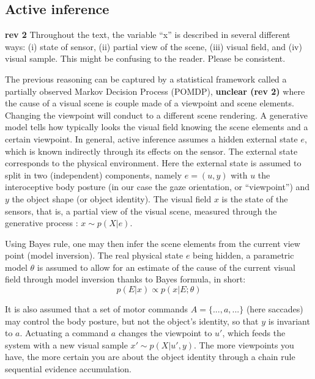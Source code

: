 \subsection*{Active inference}

{\color{red} {\bf rev 2} Throughout the text, the variable “x” is described in several different ways: (i) state of sensor, (ii)  partial view of the scene, (iii) visual field, and (iv) visual sample. This might be confusing to the reader. Please be consistent.}

The previous reasoning can be captured by a statistical framework called a
partially observed Markov Decision Process (POMDP), {\color{red} \textbf{unclear (rev 2)} where the cause of a visual scene is couple made of
a viewpoint and scene elements}. Changing the viewpoint will conduct to a different scene rendering.
A generative model tells how typically looks the visual field knowing the scene elements and a certain viewpoint. 
In general, active inference assumes a hidden external state $e$, which is known indirectly through its effects on the sensor. The external state corresponds to the physical environment. Here the external state is assumed to split in two (independent) components, namely $e = (u,y)$ with $u$ the interoceptive body posture (in our case the gaze orientation, or ``viewpoint'') and $y$ the object shape (or object identity). The visual field $x$ is the state of the sensors, that is, a partial view of the visual scene, measured through the generative process : $x\sim p(X|e)$. 


Using Bayes rule, one may then infer the scene elements from the current view point (model inversion).
 The real physical state $e$ being hidden, a parametric model $\theta$ is assumed to allow for an estimate of the cause of the current visual field through model inversion thanks to Bayes formula, in short:
$$p(E|x) \propto p(x|E;\theta)$$


It is also assumed that a set of motor commands $A = \{..., a, ...\}$ (here saccades) may control the body posture, but not the object's identity, so that $y$ is invariant to $a$. Actuating a command $a$ changes the viewpoint to $u'$, which feeds the system with a new visual sample $x'\sim p(X|u', y)$. The more viewpoints you have, the more certain you are about the object identity through a chain rule sequential evidence accumulation. 

